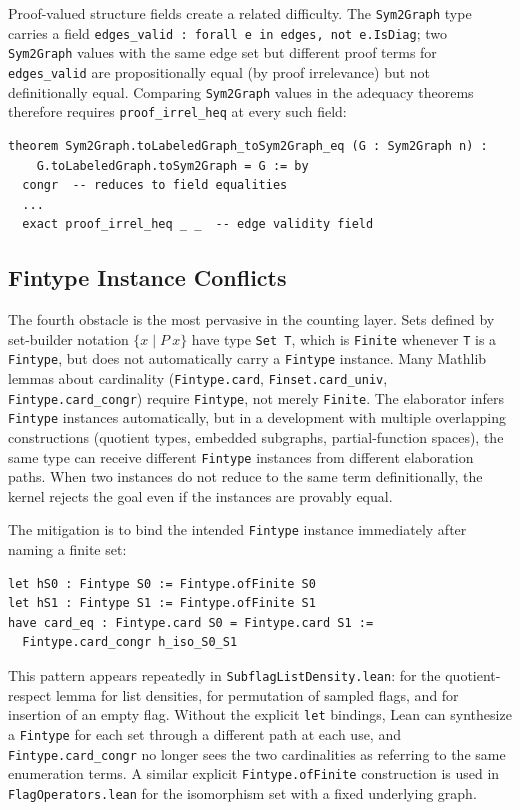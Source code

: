 \documentclass{article}
\newcommand{\lean}[1]{\texttt{#1}}
\begin{document}
Proof-valued structure fields create a related difficulty.  The
\lean{Sym2Graph} type carries a field
\lean{edges\_valid : forall e in edges, not e.IsDiag}; two \lean{Sym2Graph}
values with the same edge set but different proof terms for
\lean{edges\_valid} are propositionally equal (by proof irrelevance) but not
definitionally equal.  Comparing \lean{Sym2Graph} values in the adequacy
theorems therefore requires \lean{proof\_irrel\_heq} at every such field:
\begin{lstlisting}
theorem Sym2Graph.toLabeledGraph_toSym2Graph_eq (G : Sym2Graph n) :
    G.toLabeledGraph.toSym2Graph = G := by
  congr  -- reduces to field equalities
  ...
  exact proof_irrel_heq _ _  -- edge validity field
\end{lstlisting}

\subsection{Fintype Instance Conflicts}
\label{sec:fintype}

The fourth obstacle is the most pervasive in the counting layer.  Sets defined
by set-builder notation $\{x \mid P\ x\}$ have type \lean{Set T}, which is
\lean{Finite} whenever \lean{T} is a \lean{Fintype}, but does not
automatically carry a \lean{Fintype} instance.  Many Mathlib lemmas about
cardinality (\lean{Fintype.card}, \lean{Finset.card\_univ},
\lean{Fintype.card\_congr}) require \lean{Fintype}, not merely \lean{Finite}.
The elaborator infers \lean{Fintype} instances automatically, but in a
development with multiple overlapping constructions (quotient types, embedded
subgraphs, partial-function spaces), the same type can receive different
\lean{Fintype} instances from different elaboration paths.  When two
instances do not reduce to the same term definitionally, the kernel rejects
the goal even if the instances are provably equal.

The mitigation is to bind the intended \lean{Fintype} instance immediately
after naming a finite set:
\begin{lstlisting}
let hS0 : Fintype S0 := Fintype.ofFinite S0
let hS1 : Fintype S1 := Fintype.ofFinite S1
have card_eq : Fintype.card S0 = Fintype.card S1 :=
  Fintype.card_congr h_iso_S0_S1
\end{lstlisting}
This pattern appears repeatedly in \lean{SubflagListDensity.lean}: for the
quotient-respect lemma for list densities, for permutation of sampled flags,
and for insertion of an empty flag.  Without the explicit \lean{let} bindings,
Lean can synthesize a \lean{Fintype} for each set through a different path at
each use, and \lean{Fintype.card\_congr} no longer sees the two cardinalities
as referring to the same enumeration terms.  A similar explicit
\lean{Fintype.ofFinite} construction is used in \lean{FlagOperators.lean} for
the isomorphism set with a fixed underlying graph.
\end{document}
